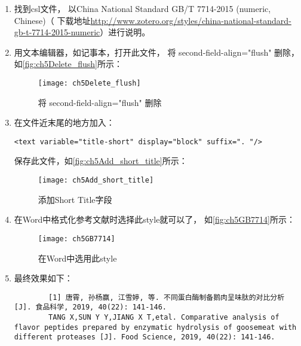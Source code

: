 \documentclass[theorem=false,mathfont=none,openany,sub3section]{easybook}
\begin{document}
{\begin{enumerate}
{		Show Data Directory}找到自己使用的数据文件夹(数据文件夹在\cref{sec:data_dir}提到)，
	进入styles文件夹，
	如\autoref{fig:ch5showDataDir2}，\autoref{fig:ch5Styles}所示：
	\begin{figure}[ht]
		\centering
		\texttt{[image: ch5showDataDir]}
		\caption{显示Zotero的数据文件夹}
		\label{fig:ch5showDataDir2}
	\end{figure}
	\begin{figure}[ht]
		\centering
		\texttt{[image: ch5Styles]}
		\caption{找到Zotero的数据文件夹}
		\label{fig:ch5Styles}
	\end{figure}
	\item 找到csl文件，
	以China National Standard GB/T 7714-2015 
	(numeric, Chinese)（
	下载地址\url{http://www.zotero.org/styles/china-national-standard-gb-t-7714-2015-numeric}）进行说明。
	\item 	用文本编辑器，如记事本，打开此文件，
	将 second-field-align="flush" 删除，如\autoref{fig:ch5Delete_flush}所示：
	\begin{figure}[ht]
		\centering
		\texttt{[image: ch5Delete\_flush]}
		\caption{将 second-field-align="flush" 删除}
		\label{fig:ch5Delete_flush}
	\end{figure}
	\item 在文件近末尾的地方加入：
	\begin{lstlisting}[language=VBScript]
		<text variable="title-short" display="block" suffix=". "/>
	\end{lstlisting}
	保存此文件，如\autoref{fig:ch5Add_short_title}所示：
	\begin{figure}[ht]
		\centering
		\texttt{[image: ch5Add\_short\_title]}
		\caption{添加Short Title字段}
		\label{fig:ch5Add_short_title}
	\end{figure}
	\item 在Word中格式化参考文献时选择此style就可以了，
	如\autoref{fig:ch5GB7714}所示：
	\begin{figure}[ht]
		\centering
		\texttt{[image: ch5GB7714]}
		\caption{在Word中选用此style}
		\label{fig:ch5GB7714}
	\end{figure}
	\item 最终效果如下：
	\begin{lstlisting}
		[1] 唐霄, 孙杨赢, 江雪婷, 等. 不同蛋白酶制备鹅肉呈味肽的对比分析[J]. 食品科学, 2019, 40(22): 141-146. 
		TANG X,SUN Y Y,JIANG X T,etal. Comparative analysis of flavor peptides prepared by enzymatic hydrolysis of goosemeat with different proteases [J]. Food Science, 2019, 40(22): 141-146.
		

\end{lstlisting}
\end{enumerate}}
\end{document}
